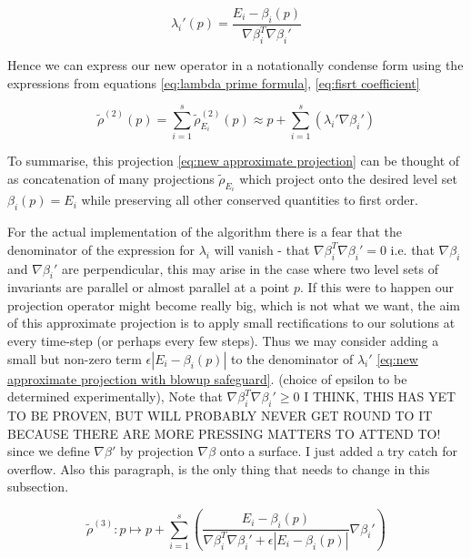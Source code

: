 \documentclass[12pt]{article}
\begin{document}
\begin{equation}\label{eq:lambda prime formula}
    \lambda_i'(p) = \frac{E_i - \beta_i(p)}{\nabla\beta_i^T \nabla\beta_i'}
\end{equation}

Hence we can express our new operator in a notationally condense form using the expressions from equations \eqref{eq:lambda prime formula}, \eqref{eq:fisrt coefficient}

\begin{equation}\label{eq:new approximate projection}
    \widetilde\rho^{(2)}(p) = 
    \sum_{i=1}^s \widetilde\rho_{E_i}^{(2)}(p) \approx p + \sum_{i=1}^s \left( \lambda_i' \nabla\beta_i' \right)
\end{equation}

To summarise, this projection \eqref{eq:new approximate projection} can be thought of as concatenation of many projections $\widetilde\rho_{E_i}$ which project onto the desired level set $\beta_i(p)=E_i$ while preserving all other conserved quantities to first order. 

For the actual implementation of the algorithm there is a fear that the denominator of the expression for $\lambda_i$ will vanish - that $\nabla\beta_i^T\nabla\beta_i'=0$ i.e. that $\nabla\beta_i$ and $\nabla\beta_i'$ are perpendicular, this may arise in the case where two level sets of invariants are parallel or almost parallel at a point $p$. If this were to happen our projection operator might become really big, which is not what we want, the aim of this approximate projection is to apply small rectifications to our solutions at every time-step (or perhaps every few steps).  Thus we may consider adding a small but non-zero term $\epsilon \left|E_i - \beta_i(p) \right|$ to the denominator of $\lambda_i'$  \eqref{eq:new approximate projection with blowup safeguard}. (choice of epsilon to be determined experimentally), Note that $\nabla\beta_i^T\nabla\beta_i'\geq 0$ I THINK, THIS HAS YET TO BE PROVEN, BUT WILL PROBABLY NEVER GET ROUND TO IT BECAUSE THERE ARE MORE PRESSING MATTERS TO ATTEND TO! since we define $\nabla\beta'$ by projection $\nabla\beta$ onto a surface. I just added a try catch for overflow. Also this paragraph, is the only thing that needs to change in this subsection.

\begin{equation}\label{eq:new approximate projection with blowup safeguard}
    \widetilde \rho^{(3)} : p \mapsto p + \sum_{i=1}^s \left( \frac{E_i - \beta_i(p)}{\nabla\beta_i^T\nabla\beta_i' + \epsilon\left|E_i - \beta_i(p)\right|} \nabla\beta_i' \right)
\end{equation}
\end{document}
